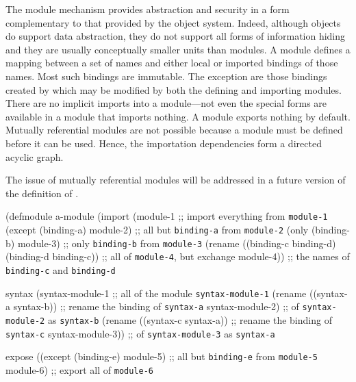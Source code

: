 \begin{optDefinition}
The module mechanism provides abstraction and security in a form complementary
to that provided by the object system.  Indeed, although objects do support data
abstraction, they do not support all forms of information hiding and they are
usually conceptually smaller units than modules.  A module defines a mapping
between a set of names and either local or imported bindings of those names.
Most such bindings are immutable.  The exception are those bindings created by
 which may be modified by both the defining and importing
modules.  There are no implicit imports into a module---not even the special
forms are available in a module that imports nothing.  A module exports nothing
by default.  Mutually referential modules are not possible because a module must
be defined before it can be used.  Hence, the importation dependencies form a
directed acyclic graph.
%
\begin{note}
    The issue of mutually referential modules will be addressed in a future
    version of the definition of \eulisp.
\end{note}
%
\begin{figure*}[t]
\begin{example}
\label{example:module}
\begin{center}
\begin{minipage}[t]{\textwidth}
{\small%
\syntax
(defmodule a-module
  (import
    (module-1                                        ;; import everything from {\tt module-1}
     (except (binding-a) module-2)                   ;; all but {\tt binding-a} from {\tt module-2}
     (only (binding-b) module-3)                     ;; only {\tt binding-b} from {\tt module-3}
     (rename
      ((binding-c binding-d) (binding-d binding-c))  ;; all of {\tt module-4}, but exchange
      module-4))                                     ;; the names of {\tt binding-c} and {\tt binding-d}

   syntax
    (syntax-module-1                                 ;; all of the module {\tt syntax-module-1}
     (rename ((syntax-a syntax-b))                   ;; rename the binding of {\tt syntax-a}
      syntax-module-2)                               ;; of {\tt syntax-module-2} as {\tt syntax-b}
     (rename ((syntax-c syntax-a))                   ;; rename the binding of {\tt syntax-c}
      syntax-module-3))                              ;; of {\tt syntax-module-3} as {\tt syntax-a}

   expose
    ((except (binding-e) module-5)                   ;; all but {\tt binding-e} from {\tt module-5}
     module-6)                                       ;; export all of {\tt module-6}

}
\end{minipage}
\end{center}
\end{example}
\end{figure*}
\end{optDefinition}
